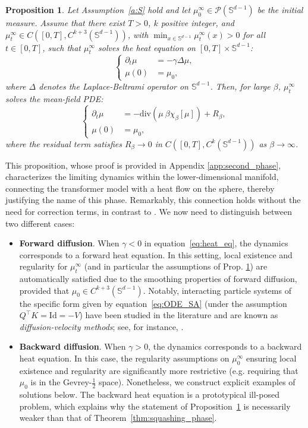 \documentclass{article}
\numberwithin{theorem}{section}
\newtheorem{proposition}[theorem]{Proposition}
\begin{document}
\begin{proposition}
\label{prop:second_phase}
Let Assumption~\ref{a:S} hold and let $\mu_0^\infty \in \mathcal{P}(\mathbb{S}^{d-1})$ be the initial measure. Assume that there exist $T > 0$,  $k$ positive integer, and $\mu^\infty_t \in C([0,T], C^{k+3}(\mathbb{S}^{d-1}))$, with $\min_{x \in \mathbb{S}^{d-1}} \mu^\infty_t(x) > 0$ for all $t\in[0,T]$, 
such that $\mu^\infty_t$ solves the heat equation on $[0,T] \times \mathbb{S}^{d-1}$:
\begin{equation}
\label{eq:heat_eq}
\begin{cases}
\partial_t \mu &= -\gamma \Delta \mu, \\
\mu(0) &= \mu_0,
\end{cases}  
\end{equation}
where $\Delta$ denotes the Laplace-Beltrami operator on $\mathbb{S}^{d-1}$.
 Then, for large $\beta$, $\mu^\infty_t$ solves the mean-field PDE:
\[
\begin{cases}
\partial_t \mu &=  -\mathrm{div}(\mu\  \beta\chi_\beta[\mu]) + R_\beta, \\
\mu(0) &= \mu_0,
\end{cases}
\]
where the residual term satisfies \( R_\beta \to 0 \) in \( C([0,T], C^{k}(\mathbb{S}^{d-1})) \) as \( \beta \to \infty \).
\end{proposition}
This proposition, whose proof is provided in Appendix \ref{app:second_phase}, characterizes the limiting dynamics within the lower-dimensional manifold, connecting the transformer model with a heat flow on the sphere, thereby justifying the name of this phase. Remarkably, this connection holds without the need for correction terms, in contrast to \cite{sander2022sinkformers}. We now need to distinguish between two different cases:
 \begin{itemize}
     \item \textbf{Forward diffusion}. When $\gamma<0$ in equation~\eqref{eq:heat_eq}, the dynamics corresponds to a forward heat equation. In this setting, local existence and regularity for $\mu^\infty_t$ (and in particular the assumptions of Prop. \ref{prop:second_phase}) are automatically satisfied due to the smoothing properties of forward diffusion, provided that $\mu_0 \in C^{k+3}(\mathbb{S}^{d-1})$. Notably, interacting particle systems of the specific form given by equation~\eqref{eq:ODE_SA} (under the assumption $Q^\top K = \mathrm{Id} = -V$) have been studied in the literature and are known as \textit{diffusion-velocity methods}; see, for instance, \cite{lions2001methode, degond1990deterministic, brenier2017geometric, lacombe1999analyse, lacombe1999presentation, mas2002diffusion}.
     \item \textbf{Backward diffusion}. When $\gamma>0$, the dynamics corresponds to a backward heat equation. In this case, the regularity assumptions on $\mu^\infty_0$ ensuring local existence and regularity are significantly more restrictive (e.g. requiring that $\mu_0$ is in the Gevrey-$\frac{1}{2}$ space). Nonetheless, we construct explicit examples of solutions below. The backward heat equation is a prototypical ill-posed problem, which explains why the statement of Proposition~\ref{prop:second_phase} is necessarily weaker than that of Theorem~\ref{thm:squashing_phase}.
 \end{itemize}
\end{document}
